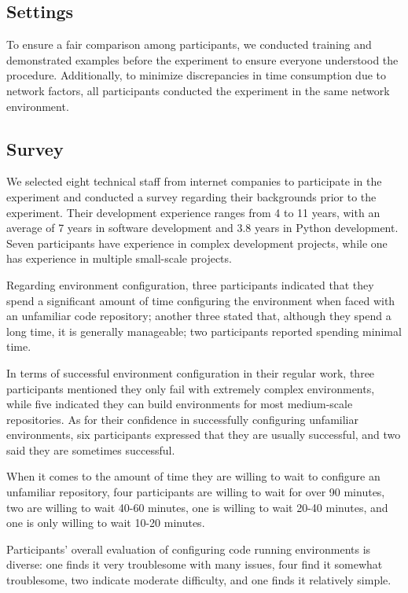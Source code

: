 \subsection{Settings}
To ensure a fair comparison among participants, we conducted training and demonstrated examples before the experiment to ensure everyone understood the procedure. Additionally, to minimize discrepancies in time consumption due to network factors, all participants conducted the experiment in the same network environment.

\subsection{Survey}
We selected eight technical staff from internet companies to participate in the experiment and conducted a survey regarding their backgrounds prior to the experiment.
Their development experience ranges from 4 to 11 years, with an average of 7 years in software development and 3.8 years in Python development. Seven participants have experience in complex development projects, while one has experience in multiple small-scale projects.

Regarding environment configuration, three participants indicated that they spend a significant amount of time configuring the environment when faced with an unfamiliar code repository; another three stated that, although they spend a long time, it is generally manageable; two participants reported spending minimal time.

In terms of successful environment configuration in their regular work, three participants mentioned they only fail with extremely complex environments, while five indicated they can build environments for most medium-scale repositories.
As for their confidence in successfully configuring unfamiliar environments, six participants expressed that they are usually successful, and two said they are sometimes successful.

When it comes to the amount of time they are willing to wait to configure an unfamiliar repository, four participants are willing to wait for over 90 minutes, two are willing to wait 40-60 minutes, one is willing to wait 20-40 minutes, and one is only willing to wait 10-20 minutes.

Participants' overall evaluation of configuring code running environments is diverse: one finds it very troublesome with many issues, four find it somewhat troublesome, two indicate moderate difficulty, and one finds it relatively simple.

